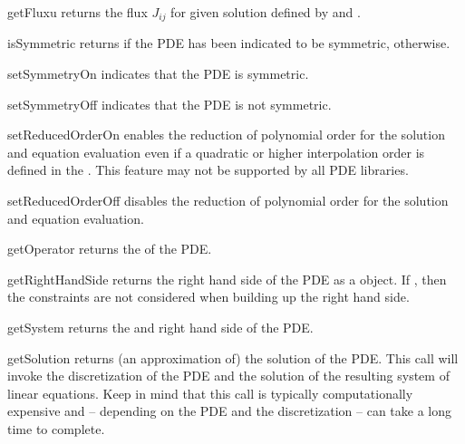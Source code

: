 \begin{methoddesc}[LinearPDE]{getFlux}{u}
returns the flux $J_{ij}$ for given solution  defined by
 and .
\end{methoddesc}

\begin{methoddesc}[LinearPDE]{isSymmetric}{}
returns \True if the PDE has been indicated to be symmetric, \False otherwise.
\end{methoddesc}

\begin{methoddesc}[LinearPDE]{setSymmetryOn}{}
indicates that the PDE is symmetric.
\end{methoddesc}

\begin{methoddesc}[LinearPDE]{setSymmetryOff}{}
indicates that the PDE is not symmetric.
\end{methoddesc}

\begin{methoddesc}[LinearPDE]{setReducedOrderOn}{}
enables the reduction of polynomial order for the solution and equation
evaluation even if a quadratic or higher interpolation order is defined in the
\Domain. This feature may not be supported by all PDE libraries.
\end{methoddesc}

\begin{methoddesc}[LinearPDE]{setReducedOrderOff}{}
disables the reduction of polynomial order for the solution and equation evaluation.
\end{methoddesc}

\begin{methoddesc}[LinearPDE]{getOperator}{}
returns the \Operator of the PDE.
\end{methoddesc}

\begin{methoddesc}[LinearPDE]{getRightHandSide}{}
returns the right hand side of the PDE as a \Data object.
If , then the constraints are not considered when
building up the right hand side.
\end{methoddesc}

\begin{methoddesc}[LinearPDE]{getSystem}{}
returns the \Operator and right hand side of the PDE.
\end{methoddesc}

\begin{methoddesc}[LinearPDE]{getSolution}{}
returns (an approximation of) the solution of the PDE. This call will invoke
the discretization of the PDE and the solution of the resulting system of
linear equations. Keep in mind that this call is typically computationally
expensive and -- depending on the PDE and the discretization -- can take a
long time to complete. 
\end{methoddesc}

